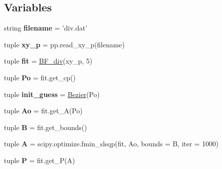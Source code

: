 \subsection*{\-Variables}
\begin{DoxyCompactItemize}
\item 
\hypertarget{namespacenozzle_aaf7e494155ffd966b135ab1d9354f2b2}{string {\bfseries filename} = 'div.\-dat'}\label{namespacenozzle_aaf7e494155ffd966b135ab1d9354f2b2}

\item 
\hypertarget{namespacenozzle_a3db3842eb192143bc6255185f4eceedf}{tuple {\bfseries xy\-\_\-p} = pp.\-read\-\_\-xy\-\_\-p(filename)}\label{namespacenozzle_a3db3842eb192143bc6255185f4eceedf}

\item 
\hypertarget{namespacenozzle_a670c3cbec06a029072b73e7483eca284}{tuple {\bfseries fit} = \hyperlink{classnozzle_1_1BF__div}{\-B\-F\-\_\-div}(xy\-\_\-p, 5)}\label{namespacenozzle_a670c3cbec06a029072b73e7483eca284}

\item 
\hypertarget{namespacenozzle_a61477428c400085b4ff609d5385c8bee}{tuple {\bfseries \-Po} = fit.\-get\-\_\-cp()}\label{namespacenozzle_a61477428c400085b4ff609d5385c8bee}

\item 
\hypertarget{namespacenozzle_ae192cb9cc38b48c742ef3ed17add92f7}{tuple {\bfseries init\-\_\-guess} = \hyperlink{classbezier_1_1Bezier}{\-Bezier}(\-Po)}\label{namespacenozzle_ae192cb9cc38b48c742ef3ed17add92f7}

\item 
\hypertarget{namespacenozzle_afde5f5f5fca5b19f5bd1dfcfa36a3247}{tuple {\bfseries \-Ao} = fit.\-get\-\_\-\-A(\-Po)}\label{namespacenozzle_afde5f5f5fca5b19f5bd1dfcfa36a3247}

\item 
\hypertarget{namespacenozzle_a98f0fccf88dc387e14739aaad09c87cf}{tuple {\bfseries \-B} = fit.\-get\-\_\-bounds()}\label{namespacenozzle_a98f0fccf88dc387e14739aaad09c87cf}

\item 
\hypertarget{namespacenozzle_a0ccb978a357e0c50ba8877e672b9d1b9}{tuple {\bfseries \-A} = scipy.\-optimize.\-fmin\-\_\-slsqp(fit, \-Ao, bounds = \-B, iter = 1000)}\label{namespacenozzle_a0ccb978a357e0c50ba8877e672b9d1b9}

\item 
\hypertarget{namespacenozzle_a16247691e5be4b935e309b6d6062bbd2}{tuple {\bfseries \-P} = fit.\-get\-\_\-\-P(\-A)}\label{namespacenozzle_a16247691e5be4b935e309b6d6062bbd2}


\end{DoxyCompactItemize}
